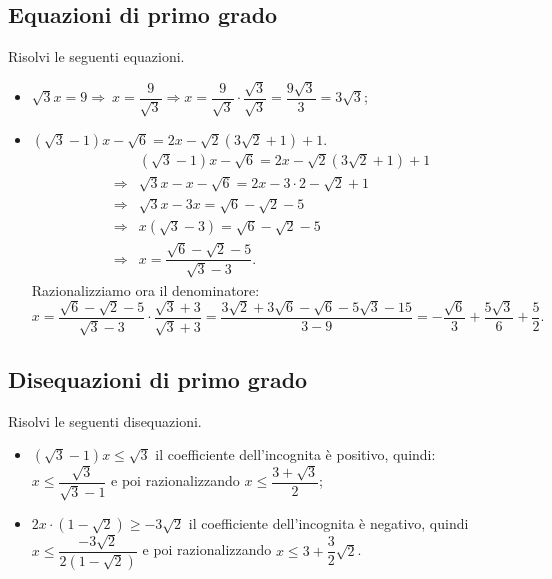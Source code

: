 \subsection{Equazioni di primo grado}
\begin{exrig}
\begin{esempio}
Risolvi le seguenti equazioni.
\begin{itemize}
 \item $\sqrt 3x=9\Rightarrow \ x=\dfrac 9{\sqrt 3} \Rightarrow x=\dfrac 9{\sqrt 3}\cdot \dfrac{\sqrt 3}{\sqrt 3}=\dfrac{9\sqrt 3} 3=3\sqrt 3$;
 \item $(\sqrt 3-1)x-\sqrt 6=2x-\sqrt 2(3\sqrt 2+1)+1$.
 \begin{align*}
&(\sqrt 3-1)x-\sqrt 6=2x-\sqrt 2(3\sqrt 2+1)+1\\
 \Rightarrow&\sqrt 3x-x-\sqrt 6=2x-3\cdot 2-\sqrt 2+1\\
 \Rightarrow&\sqrt 3x-3x=\sqrt 6-\sqrt 2-5\\
 \Rightarrow &x(\sqrt 3-3)=\sqrt 6-\sqrt 2-5\\
 \Rightarrow &x=\dfrac{\sqrt 6-\sqrt 2-5}{\sqrt 3-3}.
 \end{align*}
Razionalizziamo ora il denominatore:
 \[x=\dfrac{\sqrt 6-\sqrt 2-5}{\sqrt 3-3}\cdot \dfrac{\sqrt 3+3}{\sqrt 3+3}=\dfrac{3\sqrt 2+3\sqrt 6-\sqrt 6-5\sqrt 3-15}{3-9}=%
 -\dfrac{\sqrt 6} 3+\dfrac{5\sqrt 3} 6+\dfrac 5 2.\]
\end{itemize}
\end{esempio}
\end{exrig}

\subsection{Disequazioni di primo grado}
\begin{exrig}
\begin{esempio}
Risolvi le seguenti disequazioni.
 \begin{itemize}
 \item $(\sqrt 3-1)x\le \sqrt 3$ il coefficiente dell'incognita è positivo, quindi: $x\le \dfrac{\sqrt 3}{\sqrt 3-1}$ e poi razionalizzando $x\le \dfrac{3+\sqrt 3} 2$;
 \item $2x\cdot(1-\sqrt 2)\ge -3\sqrt 2$ il coefficiente dell'incognita è negativo, quindi $x\le \dfrac{-3\sqrt 2}{2(1-\sqrt 2)}$ e poi razionalizzando $x\le 3+\dfrac 3 2\sqrt 2$.
 \end{itemize}

\end{esempio}
\end{exrig}

